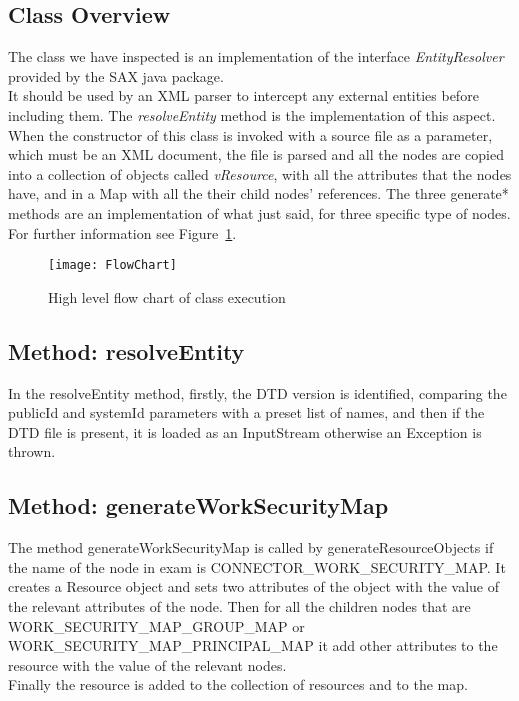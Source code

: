\subsection{Class Overview}
The class we have inspected is an implementation of the interface \textit{EntityResolver} provided by the SAX java package.\\
It should be used by an XML parser to intercept any external entities before including them. The \textit{resolveEntity} method is the implementation of this aspect.\\

When the constructor of this class is invoked with a source file as a parameter, which must be an XML document, the file is parsed and all the nodes are copied into a collection of objects called \textit{vResource}, with all the attributes that the nodes have, and in a Map with all the their child nodes' references. The three generate* methods are an implementation of what just said, for three specific type of nodes. For further information see Figure~\ref{fig:flowchart}.

\begin{figure}[]
        \centering
        \texttt{[image: FlowChart]}
        \caption{High level flow chart of class execution}
        \label{fig:flowchart}
\end{figure}

\subsection{Method: resolveEntity}
In the resolveEntity method, firstly, the DTD version is identified, comparing the publicId and systemId parameters with a preset list of names, and then if the DTD file is present, it is loaded as an InputStream otherwise an Exception is thrown.

\subsection{Method: generateWorkSecurityMap}
The method generateWorkSecurityMap is called by generateResourceObjects if the name of the node in exam is CONNECTOR\_WORK\_SECURITY\_MAP. It creates a Resource object and sets two attributes of the object with the value of the relevant attributes of the node. Then for all the children nodes that are \\WORK\_SECURITY\_MAP\_GROUP\_MAP or \\WORK\_SECURITY\_MAP\_PRINCIPAL\_MAP it add other attributes to the resource with the value of the relevant nodes.\\
Finally the resource is added to the collection of resources and to the map.

